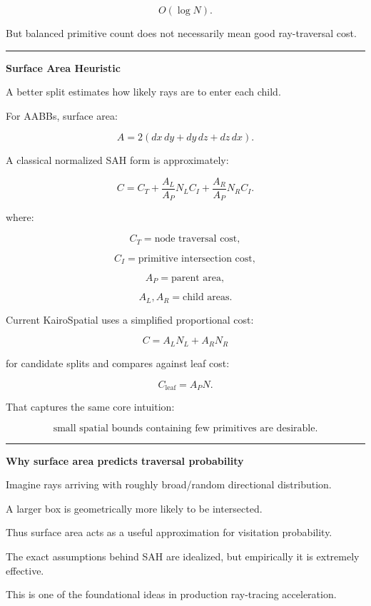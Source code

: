 \[
O(\log N).
\]

But balanced primitive count does not necessarily mean good ray-traversal cost.

\begin{center}\rule{0.5\linewidth}{0.5pt}\end{center}

\textbf{Surface Area Heuristic}

A better split estimates how likely rays are to enter each child.

For AABBs, surface area:

\[
A=
2(
dx\,dy+
dy\,dz+
dz\,dx
).
\]

A classical normalized SAH form is approximately:

\[
C=
C_T
+
\frac{A_L}{A_P}N_LC_I
+
\frac{A_R}{A_P}N_RC_I.
\]

where:

\[
C_T=\text{node traversal cost},
\]

\[
C_I=\text{primitive intersection cost},
\]

\[
A_P=\text{parent area},
\]

\[
A_L,A_R=\text{child areas}.
\]

Current KairoSpatial uses a simplified proportional cost:

\[
\boxed{
C=
A_LN_L+
A_RN_R
}
\]

for candidate splits and compares against leaf cost:

\[
C_{\text{leaf}}
=
A_PN.
\]

That captures the same core intuition:

\[
\boxed{
\text{small spatial bounds containing few primitives are desirable}.
}
\]

\begin{center}\rule{0.5\linewidth}{0.5pt}\end{center}

\textbf{Why surface area predicts traversal probability}

Imagine rays arriving with roughly broad/random directional distribution.

A larger box is geometrically more likely to be intersected.

Thus surface area acts as a useful approximation for visitation probability.

The exact assumptions behind SAH are idealized, but empirically it is extremely effective.

This is one of the foundational ideas in production ray-tracing acceleration.

